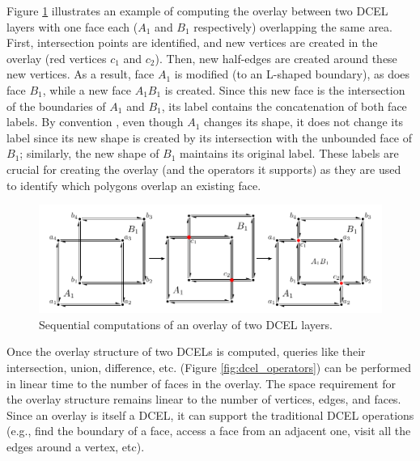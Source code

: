 Figure \ref{fig:dcel_seq} illustrates an example of computing the overlay between two DCEL layers with one face each ($A_1$ and $B_1$ respectively) overlapping 
the same area. First, intersection points are identified, and new vertices are created in the overlay (red vertices $c_1$ and $c_2$). Then, new half-edges are 
created around these new vertices. As a result, face $A_1$ is modified (to an L-shaped boundary), as does face $B_1$, while a new face $A_1B_1$ is created. 
Since this new face is the intersection of the boundaries of $A_1$ and $B_1$, its label contains the concatenation of both face labels. By convention 
\cite{berg_computational_2008}, even though $A_1$ changes its shape, it does not change its label since its new shape is created by its intersection with the 
unbounded face of $B_1$; similarly, the new shape of $B_1$ maintains its original label. These labels are crucial for creating the overlay (and the operators it 
supports) as they are used to identify which polygons overlap an existing face.

\begin{figure}
    \centering
    \includegraphics[width=\textwidth]{chapterSDCEL/dcel2}
    \caption{Sequential computations of an overlay of two DCEL layers.}\label{fig:dcel_seq}
\end{figure}

Once the overlay structure of two DCELs is computed, queries like their intersection, union, difference, etc. (Figure \ref{fig:dcel_operators}) can 
be performed in linear time to the number of faces in the overlay. The space requirement for the overlay structure remains linear to the number of vertices, 
edges, and faces. Since an overlay is itself a DCEL, it can support the traditional DCEL operations (e.g., find the boundary of a face, access a face from an 
adjacent one, visit all the edges around a vertex, etc).

